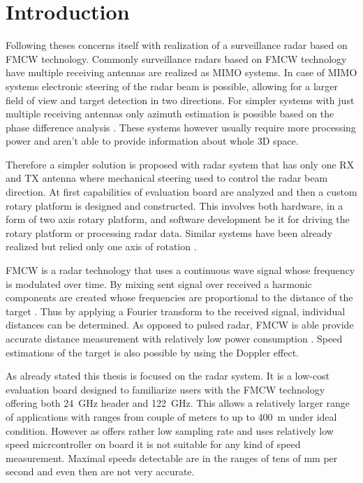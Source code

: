 
\chapter*{Introduction}

Following theses concerns itself with realization of a surveillance radar based on FMCW technology.
Commonly surveillance radars based on FMCW technology have multiple receiving antennas are realized as MIMO systems.
In case of MIMO systems electronic steering of the radar beam is possible, allowing for a larger field of view and target detection in two directions.
For simpler systems with just multiple receiving antennas only azimuth estimation is possible based on the phase difference analysis \cite{sandeep2018}.
These systems however usually require more processing power and aren't able to provide information about whole 3D space.

Therefore a simpler solution is proposed with radar system that has only one RX and TX antenna where mechanical steering used to control the radar beam direction.
At first capabilities of \sidar evaluation board are analyzed and then a custom rotary platform is designed and constructed.
This involves both hardware, in a form of two axis rotary platform, and software development be it for driving the rotary platform or processing radar data.
Similar systems have been already realized but relied only one axis of rotation \cite{nowok2017, vivet2013}.

FMCW is a radar technology that uses a continuous wave signal whose frequency is modulated over time.
By mixing sent signal over received a harmonic components are created whose frequencies are proportional to the distance of the target \cite{graham2005}.
Thus by applying a Fourier transform to the received signal, individual distances can be determined.
As opposed to pulsed radar, FMCW is able provide accurate distance measurement with relatively low power consumption \cite{jankiraman2018}.
Speed estimations of the target is also possible by using the Doppler effect.


As already stated this thesis is focused on the \sidar radar system.
It is a low-cost evaluation board designed to familiarize users with the FMCW technology offering both 24~GHz header and 122~GHz\cite{sidarMAN}.
This allows a relatively larger range of applications with ranges from couple of meters to up to 400~m \cite{sidarMANOld} under ideal condition.
However as \sidar offers rather low sampling rate and uses relatively low speed micrcontroller on board it is not suitable for any kind of speed measurement.
Maximal speeds detectable are in the ranges of tens of mm per second and even then are not very accurate.

